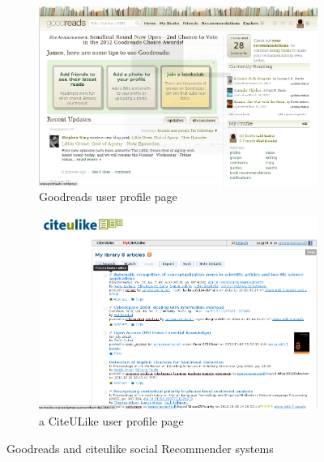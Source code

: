\begin{figure}[!hbt]
        \centering
        \begin{subfigure}[b]{0.50\textwidth}
                \centering
                \includegraphics[width=\textwidth]{images/goodreads_index.png}
                \caption{Goodreads user profile page}
                \label{fig:goodreads_index}
        \end{subfigure}%
        \begin{subfigure}[b]{0.50\textwidth}
                \centering
                \includegraphics[width=\textwidth]{images/citeulike_index.png}
                \caption{a CiteULike user profile page}
                \label{fig:citeulike_index}
        \end{subfigure}

        \caption{Goodreads and citeulike social Recommender systems}
        \label{fig:social_indexes}
\end{figure}

